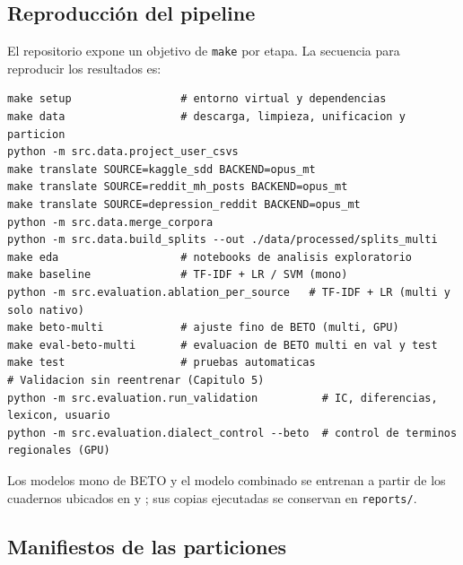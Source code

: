 \documentclass[12pt,a4paper]{article}
\begin{document}
\subsection{Reproducción del pipeline}
\label{anx:reproduccion}
El repositorio expone un objetivo de \texttt{make} por etapa. La secuencia para reproducir los resultados es:

\begin{lstlisting}
make setup                 # entorno virtual y dependencias
make data                  # descarga, limpieza, unificacion y particion
python -m src.data.project_user_csvs
make translate SOURCE=kaggle_sdd BACKEND=opus_mt
make translate SOURCE=reddit_mh_posts BACKEND=opus_mt
make translate SOURCE=depression_reddit BACKEND=opus_mt
python -m src.data.merge_corpora
python -m src.data.build_splits --out ./data/processed/splits_multi
make eda                   # notebooks de analisis exploratorio
make baseline              # TF-IDF + LR / SVM (mono)
python -m src.evaluation.ablation_per_source   # TF-IDF + LR (multi y solo nativo)
make beto-multi            # ajuste fino de BETO (multi, GPU)
make eval-beto-multi       # evaluacion de BETO multi en val y test
make test                  # pruebas automaticas
# Validacion sin reentrenar (Capitulo 5)
python -m src.evaluation.run_validation          # IC, diferencias, lexicon, usuario
python -m src.evaluation.dialect_control --beto  # control de terminos regionales (GPU)
\end{lstlisting}

Los modelos mono de BETO y el modelo combinado se entrenan a partir de los cuadernos ubicados en  y ; sus copias ejecutadas se conservan en \texttt{reports/}.

\subsection{Manifiestos de las particiones}
\label{anx:manifiestos}
\end{document}
